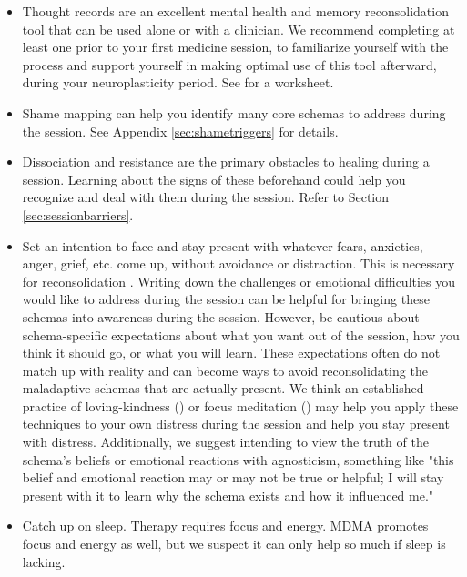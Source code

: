 \documentclass[12pt,letterpaper]{book}
\begin{document}
\begin{itemize}
    \item {} Thought records are an excellent mental health and memory reconsolidation tool that can be used alone or with a clinician. We recommend completing at least one prior to your first medicine session, to familiarize yourself with the process and support yourself in making optimal use of this tool afterward, during your neuroplasticity period. See \textcite{harperThought} for a worksheet.
    \item Shame mapping can help you identify many core schemas to address during the session. See Appendix \ref{sec:shametriggers} for details.
    \item Dissociation and resistance are the primary obstacles to healing during a session. Learning about the signs of these beforehand could help you recognize and deal with them during the session. Refer to Section \ref{sec:sessionbarriers}.
    \item Set an intention to face and stay present with whatever fears, anxieties, anger, grief, etc. come up, without avoidance or distraction. This is necessary for reconsolidation \cite{eckerUnlocking}. Writing down the challenges or emotional difficulties you would like to address during the session can be helpful for bringing these schemas into awareness during the session. However, be cautious about schema-specific expectations about what you want out of the session, how you think it should go, or what you will learn. These expectations often do not match up with reality and can become ways to avoid reconsolidating the maladaptive schemas that are actually present. We think an established practice of loving-kindness (\textcite{lkMeditation}) or focus meditation (\textcite{rain}) may help you apply these techniques to your own distress during the session and help you stay present with distress. Additionally, we suggest intending to view the truth of the schema's beliefs or emotional reactions with agnosticism, something like "this belief and emotional reaction may or may not be true or helpful; I will stay present with it to learn why the schema exists and how it influenced me."
    \item Catch up on sleep. Therapy requires focus and energy. MDMA promotes focus and energy as well, but we suspect it can only help so much if sleep is lacking.

\end{itemize}
\end{document}
